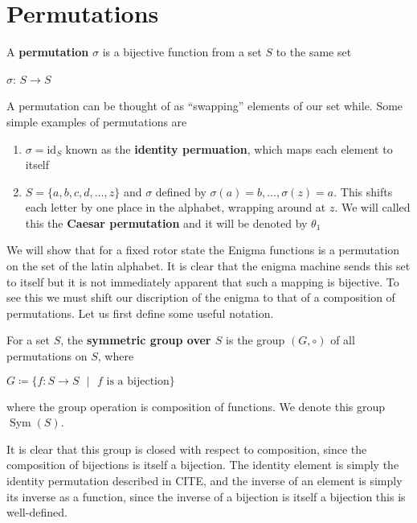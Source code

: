\chapter{Permutations}

\begin{definition}
    A \textbf{permutation} $\sigma$ is a bijective function from a set $S$ to 
    the same set 
    \begin{center}
        $\sigma$: $S\to S$
    \end{center}
\end{definition}

A permutation can be thought of as ``swapping'' elements of our set while. Some simple examples 
of permutations are
\begin{example}
    \text{}
    \begin{enumerate}
        \item$\sigma = \text{id}_S$ known as the \textbf{identity permuation}, which maps each element to itself
        \item$S = \{a, b, c, d, \dots, z\}$ and $\sigma$ defined by $\sigma(a) = b, \dots, \sigma(z) = a$. This shifts 
        each letter by one place in the alphabet, wrapping around at $z$. We will called this the \textbf{Caesar permutation} and it will be denoted by 
        $\theta_1$
    \end{enumerate}
\end{example}

We will show that for a fixed rotor state the Enigma functions is a permutation on the set of the latin alphabet.
It is clear that the enigma machine sends this set to itself but it is not immediately apparent that such a mapping is bijective. To see this
we must shift our discription of the enigma to that of a composition of permutations. Let us first define some useful notation.

\begin{definition}
    For a set $S$, the \textbf{symmetric group over $S$} is the group $(G,\circ)$ of all permutations on $S$, where
    \begin{center}
        $G\coloneq\{f: S\to S\text{ }\vert\text{ }f\text{ is a bijection}\}$
    \end{center}
    where the group operation is composition of functions. We denote this group $\operatorname{Sym}(S)$.
\end{definition}

It is clear that this group is closed with respect to composition, since the composition of bijections is itself a bijection. The identity element is simply the identity permutation described in CITE, and 
the inverse of an element is simply its inverse as a function, since the inverse of a bijection is itself a bijection this is well-defined.

